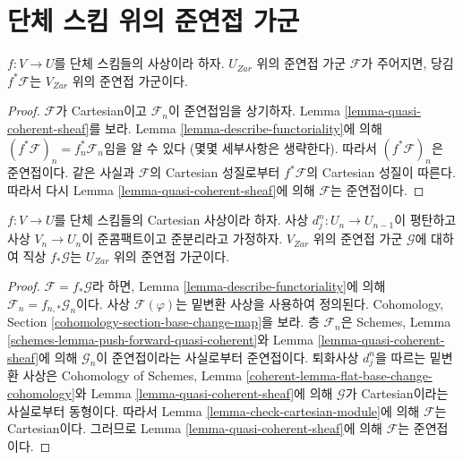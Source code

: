 \section{단체 스킴 위의 준연접 가군}
\label{section-modules-simplicial}

\begin{lemma}
\label{lemma-pullback-cartesian-module}
$f : V \to U$를 단체 스킴들의 사상이라 하자. $U_{Zar}$ 위의
준연접 가군 $\mathcal{F}$가 주어지면, 당김 $f^*\mathcal{F}$는
$V_{Zar}$ 위의 준연접 가군이다.
\end{lemma}

\begin{proof}
$\mathcal{F}$가 Cartesian이고 $\mathcal{F}_n$이 준연접임을
상기하자. Lemma \ref{lemma-quasi-coherent-sheaf}를 보라.
Lemma \ref{lemma-describe-functoriality}에 의해
$(f^*\mathcal{F})_n = f_n^*\mathcal{F}_n$임을 알 수 있다
(몇몇 세부사항은 생략한다). 따라서 $(f^*\mathcal{F})_n$은
준연접이다. 같은 사실과 $\mathcal{F}$의 Cartesian 성질로부터
$f^*\mathcal{F}$의 Cartesian 성질이 따른다.
따라서 다시 Lemma \ref{lemma-quasi-coherent-sheaf}에 의해
$\mathcal{F}$는 준연접이다.
\end{proof}

\begin{lemma}
\label{lemma-pushforward-cartesian-module}
$f : V \to U$를 단체 스킴들의 Cartesian 사상이라 하자.
사상 $d^n_j : U_n \to U_{n - 1}$이 평탄하고 사상
$V_n \to U_n$이 준콤팩트이고 준분리라고 가정하자.
$V_{Zar}$ 위의 준연접 가군 $\mathcal{G}$에 대하여
직상 $f_*\mathcal{G}$는 $U_{Zar}$ 위의 준연접 가군이다.
\end{lemma}

\begin{proof}
$\mathcal{F} = f_* \mathcal{G}$라 하면, Lemma
\ref{lemma-describe-functoriality}에 의해
$\mathcal{F}_n = f_{n , *}\mathcal{G}_n$이다.
사상 $\mathcal{F}(\varphi)$는 밑변환 사상을 사용하여 정의된다.
Cohomology, Section \ref{cohomology-section-base-change-map}을 보라.
층 $\mathcal{F}_n$은 Schemes, Lemma
\ref{schemes-lemma-push-forward-quasi-coherent}와
Lemma \ref{lemma-quasi-coherent-sheaf}에 의해
$\mathcal{G}_n$이 준연접이라는 사실로부터 준연접이다.
퇴화사상 $d^n_j$을 따르는 밑변환 사상은 Cohomology of Schemes,
Lemma \ref{coherent-lemma-flat-base-change-cohomology}와
Lemma \ref{lemma-quasi-coherent-sheaf}에 의해
$\mathcal{G}$가 Cartesian이라는 사실로부터 동형이다.
따라서 Lemma \ref{lemma-check-cartesian-module}에 의해
$\mathcal{F}$는 Cartesian이다. 그러므로 Lemma
\ref{lemma-quasi-coherent-sheaf}에 의해 $\mathcal{F}$는 준연접이다.
\end{proof}

